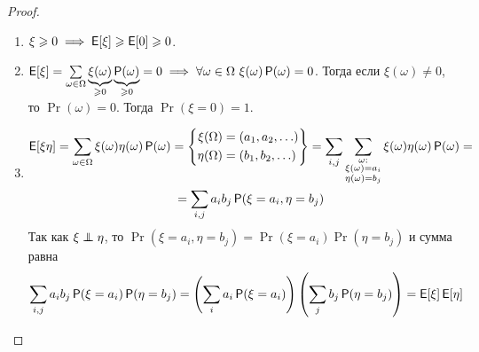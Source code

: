 \begin{proof}
\begin{enumerate}
        \item \(\xi \geqslant 0 \implies \operatorname{\mathsf{E}}[\xi] \geqslant \operatorname{\mathsf{E}}[0] \geqslant 0\).
        
        \item \(\operatorname{\mathsf{E}}[\xi] = \sum\limits_{\omega \in \Omega} \underbrace{\xi(\omega)}_{\geqslant 0}\underbrace{\operatorname{\mathsf{P}}(\omega)}_{\geqslant 0} = 0 \implies \forall \omega \in \Omega\ \xi(\omega)\operatorname{\mathsf{P}}(\omega) = 0\). Тогда если \(\xi(\omega) \neq 0\), то \(\Pr(\omega) = 0\). Тогда \(\Pr(\xi = 0) = 1\).
        
        \item 
        \begin{multline*}
        \operatorname{\mathsf{E}}[\xi\eta] =
        \sum_{\omega \in \Omega}\xi(\omega)\eta(\omega)\operatorname{\mathsf{P}}(\omega) =
        \left\{
        \begin{aligned}
        \xi(\Omega) &= (a_1, a_2, \ldots)\\ 
        \eta(\Omega) &= (b_1, b_2, \ldots)
        \end{aligned}
        \right\} =
        \sum_{i, j}\sum_{
            \substack{
                \omega:\\
                \xi(\omega) = a_i\\
                \eta(\omega) = b_j
            }
        }\xi(\omega)\eta(\omega)\operatorname{\mathsf{P}}(\omega) =\\=
        \sum_{i, j}a_ib_j\operatorname{\mathsf{P}}(\xi = a_i, \eta = b_j)
        \end{multline*}
        Так как \(\xi \independent \eta\), то \(\Pr(\xi = a_i, \eta = b_j) = \Pr(\xi = a_i)\Pr(\eta = b_j)\) и сумма равна
        \begin{multline*}
        \sum_{i, j}a_ib_j\operatorname{\mathsf{P}}(\xi = a_i)\operatorname{\mathsf{P}}(\eta = b_j)=
        \left(\sum_{i}a_i\operatorname{\mathsf{P}}(\xi = a_i)\right)\left(\sum_{j}b_j\operatorname{\mathsf{P}}(\eta = b_j)\right)=
        \operatorname{\mathsf{E}}[\xi]\operatorname{\mathsf{E}}[\eta]
        \end{multline*}
     \end{enumerate}   
\end{proof}

